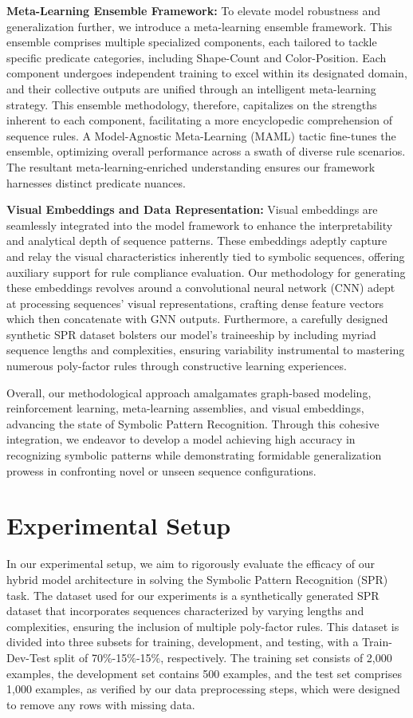 \documentclass{article}
\begin{document}
\textbf{Meta-Learning Ensemble Framework:} To elevate model robustness and generalization further, we introduce a meta-learning ensemble framework. This ensemble comprises multiple specialized components, each tailored to tackle specific predicate categories, including Shape-Count and Color-Position. Each component undergoes independent training to excel within its designated domain, and their collective outputs are unified through an intelligent meta-learning strategy. This ensemble methodology, therefore, capitalizes on the strengths inherent to each component, facilitating a more encyclopedic comprehension of sequence rules. A Model-Agnostic Meta-Learning (MAML) tactic fine-tunes the ensemble, optimizing overall performance across a swath of diverse rule scenarios. The resultant meta-learning-enriched understanding ensures our framework harnesses distinct predicate nuances.

\textbf{Visual Embeddings and Data Representation:} Visual embeddings are seamlessly integrated into the model framework to enhance the interpretability and analytical depth of sequence patterns. These embeddings adeptly capture and relay the visual characteristics inherently tied to symbolic sequences, offering auxiliary support for rule compliance evaluation. Our methodology for generating these embeddings revolves around a convolutional neural network (CNN) adept at processing sequences' visual representations, crafting dense feature vectors which then concatenate with GNN outputs. Furthermore, a carefully designed synthetic SPR dataset bolsters our model's traineeship by including myriad sequence lengths and complexities, ensuring variability instrumental to mastering numerous poly-factor rules through constructive learning experiences.

Overall, our methodological approach amalgamates graph-based modeling, reinforcement learning, meta-learning assemblies, and visual embeddings, advancing the state of Symbolic Pattern Recognition. Through this cohesive integration, we endeavor to develop a model achieving high accuracy in recognizing symbolic patterns while demonstrating formidable generalization prowess in confronting novel or unseen sequence configurations.
\section{Experimental Setup}
In our experimental setup, we aim to rigorously evaluate the efficacy of our hybrid model architecture in solving the Symbolic Pattern Recognition (SPR) task. The dataset used for our experiments is a synthetically generated SPR dataset that incorporates sequences characterized by varying lengths and complexities, ensuring the inclusion of multiple poly-factor rules. This dataset is divided into three subsets for training, development, and testing, with a Train-Dev-Test split of 70\%-15\%-15\%, respectively. The training set consists of 2,000 examples, the development set contains 500 examples, and the test set comprises 1,000 examples, as verified by our data preprocessing steps, which were designed to remove any rows with missing data.
\end{document}
